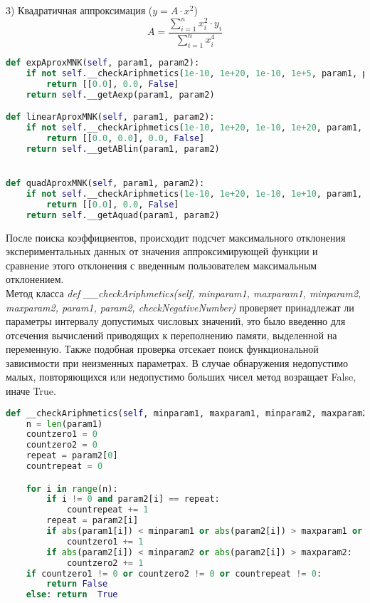     3) Квадратичная аппроксимация ($y = A \cdot x^2$)
    $$ A = \frac{\sum^n_{i=1} x_i^2 \cdot y_i}{\sum^n_{i=1} x_i^4}$$

    \begin{lstlisting}[language=Python]
def expAproxMNK(self, param1, param2):
    if not self.__checkAriphmetics(1e-10, 1e+20, 1e-10, 1e+5, param1, param2, True):
        return [[0.0], 0.0, False]
    return self.__getAexp(param1, param2)

def linearAproxMNK(self, param1, param2):
    if not self.__checkAriphmetics(1e-10, 1e+20, 1e-10, 1e+20, param1, param2, False):
        return [[0.0, 0.0], 0.0, False]
    return self.__getABlin(param1, param2)


def quadAproxMNK(self, param1, param2):
    if not self.__checkAriphmetics(1e-10, 1e+20, 1e-10, 1e+10, param1, param2, False):
        return [[0.0], 0.0, False]
    return self.__getAquad(param1, param2)
    \end{lstlisting}

    После поиска коэффициентов, происходит подсчет максимального отклонения экспериментальных данных от значения аппроксимирующей функции и сравнение этого отклонения с введенным пользователем максимальным отклонением.\\

    Метод класса \textit{def \_\_checkAriphmetics(self, minparam1, maxparam1, minparam2, maxparam2, param1, param2, checkNegativeNumber)} проверяет принадлежат ли параметры интервалу допустимых числовых значений, это было введенно для отсечения вычислений приводящих к переполнению памяти, выделенной на переменную. Также подобная проверка отсекает поиск функциональной зависимости при неизменных параметрах. В случае обнаружения недопустимо малых, повторяющихся или недопустимо больших чисел метод возращает False, иначе True. 

    \begin{lstlisting}[language=Python]
def __checkAriphmetics(self, minparam1, maxparam1, minparam2, maxparam2, param1, param2, checkNegativeNumber):
    n = len(param1)
    countzero1 = 0
    countzero2 = 0
    repeat = param2[0]
    countrepeat = 0

    for i in range(n):
        if i != 0 and param2[i] == repeat:
            countrepeat += 1
        repeat = param2[i]
        if abs(param1[i]) < minparam1 or abs(param2[i]) > maxparam1 or (checkNegativeNumber and param1[i] < 0.0):
            countzero1 += 1
        if abs(param2[i]) < minparam2 or abs(param2[i]) > maxparam2:
            countzero2 += 1
    if countzero1 != 0 or countzero2 != 0 or countrepeat != 0:
        return False
    else: return  True
    \end{lstlisting}

